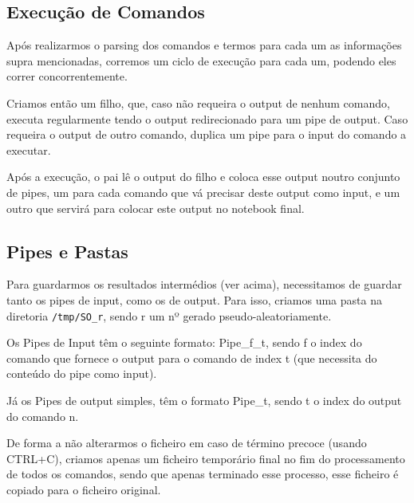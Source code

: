 \documentclass[a4paper]{article}
\begin{document}
	\subsection{Execução de Comandos}
		\tab Após realizarmos o parsing dos comandos e termos para cada um as informações
		supra mencionadas, corremos um ciclo de execução para cada um, podendo eles
		correr concorrentemente.
		\par Criamos então um filho, que, caso não requeira o output de nenhum comando,
		executa regularmente tendo o output redirecionado para um pipe de output. Caso
		requeira o output de outro comando, duplica um pipe para o input do comando a executar.
		\par Após a execução, o pai lê o output do filho e coloca esse output noutro conjunto
		de pipes, um para cada comando que vá precisar deste output como input, e um outro
		que servirá para colocar este output no notebook final.

	\subsection{Pipes e Pastas}
		\tab Para guardarmos os resultados intermédios (ver acima), necessitamos de guardar
		tanto os pipes de input, como os de output. Para isso, criamos uma pasta na diretoria
		\texttt{/tmp/SO\_r}, sendo r um nº gerado pseudo-aleatoriamente.
		\par Os Pipes de Input têm o seguinte formato: Pipe\_f\_t, sendo
		f o index do comando que fornece o output para o comando de index t (que necessita do conteúdo do pipe como input).
		\par Já os Pipes de output simples, têm o formato Pipe\_t, sendo t o index do output
		do comando n.
		\par De forma a não alterarmos o ficheiro em caso de término precoce (usando CTRL+C),
		criamos apenas um ficheiro temporário final no fim do processamento de todos os comandos,
		sendo que apenas terminado esse processo, esse ficheiro é copiado para o ficheiro
		original.
\end{document}
